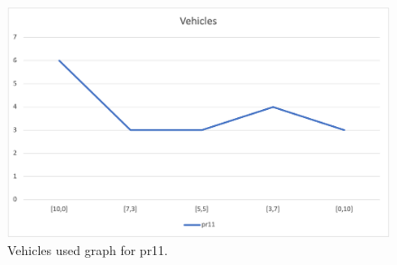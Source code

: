 \begin{figure}[H]
    \centering
    \includegraphics[width=1.0\columnwidth]{../graphs/pr11-vehicles.png}
    \caption{Vehicles used graph for pr11.}
\end{figure}
